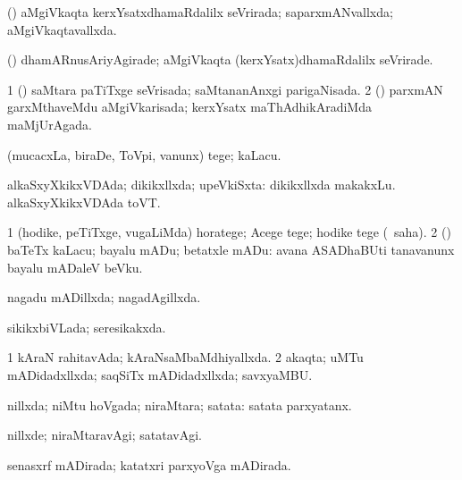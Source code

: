 {\bentry
{} 
\gl{\gu}
\expl{}
\bmng
(\kerxY) aMgiVkaqta kerxYsatxdhamaRdalilx seVrirada; saparxmANvallxda; aMgiVkaqtavallxda. 
\emng
\eentry

\bentry
{} 
\gl{\kirxvi}
\expl{}
\bmng
(\kerxY) dhamARnusAriyAgirade; aMgiVkaqta (kerxYsatx)dhamaRdalilx seVrirade. 
\emng
\eentry

\bentry
{} 
\gl{\gu}
\expl{}
\bmng
\bnum
\num{1} (\kerxY) saMtara paTiTxge seVrisada; saMtananAnxgi parigaNisada. 
\num{2} (\kerxY) parxmAN garxMthaveMdu aMgiVkarisada; kerxYsatx maThAdhikAradiMda maMjUrAgada. 
\enum
\emng
\eentry

\bentry
{} 
\gl{\sakirx}
\bmng
(mucacxLa, biraDe, ToVpi, \mo vanunx) tege; kaLacu. 
\emng
\eentry

\bentry
{} 
\gl{\gu}
\expl{}
\bmng
alkaSxyXkikxVDAda; dikikxllxda; upeVkiSxta:  dikikxllxda makakxLu.  alkaSxyXkikxVDAda toVT. 
\emng
\eentry

\bentry
{} 
\gl{\sakirx}
\expl{}
\bmng
\bnum
\num{1} (hodike, peTiTxge, \mo vugaLiMda) horatege; Acege tege; hodike tege (\akirx\ saha). 
\num{2} (\pArxparx) baTeTx kaLacu; bayalu mADu; betatxle mADu:  avana ASADhaBUti tanavanunx bayalu mADaleV beVku. 
\enum
\emng
\eentry

\bentry
{} 
\gl{\gu}
\expl{}
\bmng
nagadu mADillxda; nagadAgillxda. 
\emng
\eentry

\bentry
{} 
\gl{\gu}
\bmng
sikikxbiVLada; seresikakxda. 
\emng
\eentry

\bentry
{} 
\gl{\gu}
\expl{}
\bmng
\bnum
\num{1} kAraN rahitavAda; kAraNsaMbaMdhiyallxda. 
\num{2} akaqta; uMTu mADidadxllxda; saqSiTx mADidadxllxda; savxyaMBU. 
\enum
\emng
\eentry

\bentry
{} 
\gl{\gu}
\expl{}
\bmng
nillxda; niMtu hoVgada; niraMtara; satata:  satata parxyatanx. 
\emng
\eentry

\bentry
{} 
\gl{\kirxvi}
\expl{}
\bmng
nillxde; niraMtaravAgi; satatavAgi. 
\emng
\eentry

\bentry
{} 
\gl{\gu}
\expl{}
\bmng
senasxrf mADirada; katatxri parxyoVga mADirada. 
\emng
\eentry

}
